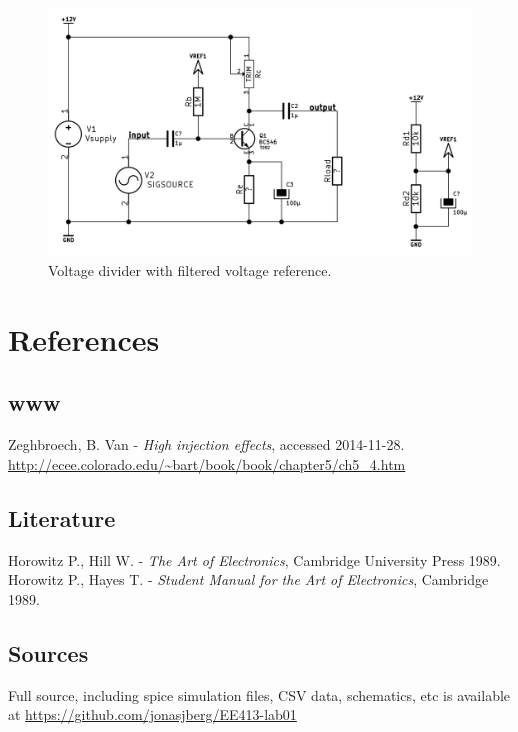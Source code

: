 \documentclass[11pt,a4paper]{article}
\begin{document}
\begin{figure}[htbp]
    \centering
    \includegraphics[width=\textwidth]{img/bjt-bias_2AC_quiet.png}
    \caption{Voltage divider with filtered voltage reference.}
    \label{fig:bjt-bias_2AC_quiet}
\end{figure}

\pagebreak
\section{References}\label{references}

\subsection{www}\label{www}
Zeghbroech, B. Van - \textit{High injection effects}, accessed 2014-11-28. \\
\url{http://ecee.colorado.edu/~bart/book/book/chapter5/ch5_4.htm}

\subsection{Literature}\label{literature}

Horowitz P., Hill W. -  \textit{The Art of Electronics}, Cambridge University Press 1989.\\
\medskip 
Horowitz P., Hayes T. - \textit{Student Manual for the Art of Electronics}, Cambridge 1989.

\subsection{Sources}\label{sources}
Full source, including spice simulation files, CSV data, schematics, etc
is available at \url{https://github.com/jonasjberg/EE413-lab01}


\end{document}

